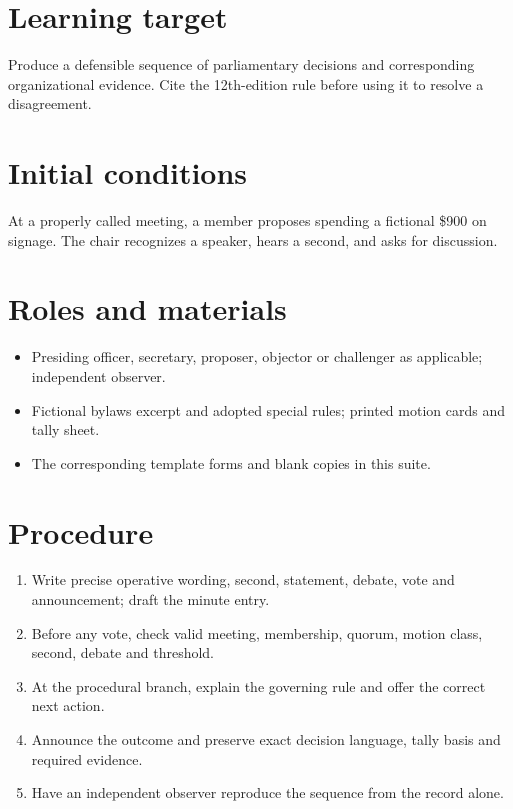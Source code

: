 \documentclass[11pt]{article}
\begin{document}
\SuiteOpen
\section{Learning target}
Produce a defensible sequence of parliamentary decisions and corresponding organizational evidence. Cite the 12th-edition rule before using it to resolve a disagreement.

\section{Initial conditions}
At a properly called meeting, a member proposes spending a fictional \$900 on signage. The chair recognizes a speaker, hears a second, and asks for discussion.

\section{Roles and materials}
\begin{itemize}[leftmargin=*,itemsep=4pt]
\item Presiding officer, secretary, proposer, objector or challenger as applicable; independent observer.
\item Fictional bylaws excerpt and adopted special rules; printed motion cards and tally sheet.
\item The corresponding template forms and blank copies in this suite.
\end{itemize}

\section{Procedure}
\begin{enumerate}[leftmargin=*,itemsep=4pt]
\item Write precise operative wording, second, statement, debate, vote and announcement; draft the minute entry.
\item Before any vote, check valid meeting, membership, quorum, motion class, second, debate and threshold.
\item At the procedural branch, explain the governing rule and offer the correct next action.
\item Announce the outcome and preserve exact decision language, tally basis and required evidence.
\item Have an independent observer reproduce the sequence from the record alone.
\end{enumerate}
\end{document}
